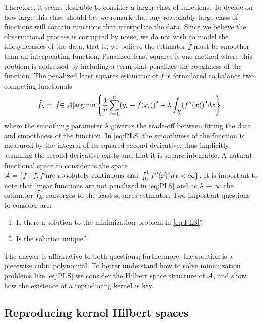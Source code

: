 Therefore, it seems desirable to consider a larger class of functions. To decide on how large this class should be, we remark that any reasonably large class of functions will contain functions that interpolate the data. Since we believe the observational process is corrupted by noise, we do not wish to model the idiosyncrasies of the data; that is,  we believe the estimator $\hat{f}$ must be smoother than an interpolating function. Penalized least squares is one method where this problem is addressed by including a term that penalizes the roughness of the function. The penalized least squares estimator of $f$ is formulated to balance two competing functionals 
\begin{equation}
\widehat{f}_{\lambda} = \hspace{.07in}\stackrel[f \in \mathcal{A}]{}{\mbox{argmin}} \left\{ \frac{1}{n}\sum_{i=1}^{n}(y_i - f(x_i))^2 + \lambda\int_{\mathcal{X}}(f''(x))^2dx \right\},
\label{eq:PLS}
\end{equation}
where the smoothing parameter $\lambda$ governs the trade-off between fitting the data and smoothness of the function. In \eqref{eq:PLS} the smoothness of the function is measured by the integral of its squared second derivative, thus implicitly assuming the second derivative exists and that it is square integrable. A natural functional space to consider is the space $\mathcal{A} = \{f: f, f' \mbox{are absolutely continuous and } \int_0^1f''(x)^2dx <\infty\}$. It is important to note that linear functions are not penalized in \eqref{eq:PLS} and as $\lambda \rightarrow \infty$ the estimator $\widehat{f_{\lambda}}$ converges to the least squares estimator. Two important questions to consider are: 
\begin{enumerate}
	\item Is there a solution to the minimization problem in \eqref{eq:PLS}?
	\item Is the solution unique?
\end{enumerate}
The answer is affirmative to both questions; furthermore, the solution is a piecewise cubic polynomial.  To better understand how to solve minimization problems like \eqref{eq:PLS} we consider the Hilbert space structure of $\mathcal{A}$, and show how the existence of a reproducing kernel is key. 
 

\subsection{Reproducing kernel Hilbert spaces}


